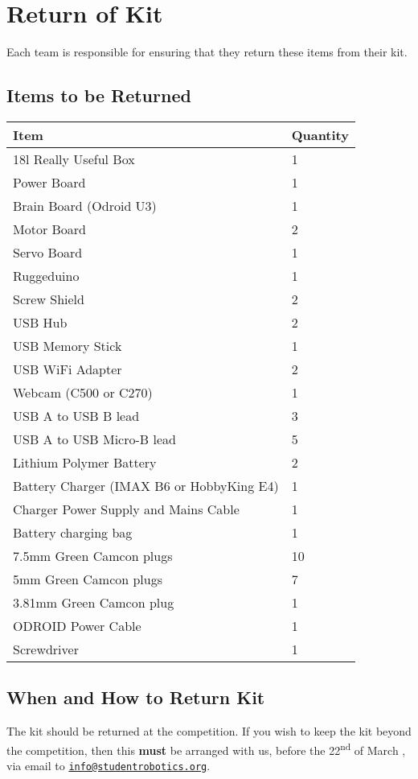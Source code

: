 \section {Return of Kit}
\label{sec:kit-return}

Each team is responsible for ensuring that they return these items from their kit.

\subsection {Items to be Returned}

\begin{tabular}{ll}
 \toprule
 \textbf{Item} & \textbf{Quantity} \\
 \midrule
 18l Really Useful Box & 1 \\

 Power Board & 1 \\
 Brain Board (Odroid U3) & 1 \\
 Motor Board & 2 \\
 Servo Board & 1 \\
 Ruggeduino & 1 \\
 Screw Shield & 2 \\

 USB Hub & 2 \\
 USB Memory Stick & 1 \\
 USB WiFi Adapter & 2 \\
 Webcam (C500 or C270) & 1 \\
 USB A to USB B lead & 3 \\
 USB A to USB Micro-B lead & 5 \\

 Lithium Polymer Battery & 2 \\
 Battery Charger (IMAX B6 or HobbyKing E4) & 1 \\
 Charger Power Supply and Mains Cable & 1 \\
 Battery charging bag & 1 \\

 7.5mm Green Camcon plugs & 10 \\
 5mm Green Camcon plugs & 7 \\
 3.81mm Green Camcon plug & 1 \\
 ODROID Power Cable & 1 \\
 Screwdriver & 1 \\
 \bottomrule
\end{tabular}

\subsection {When and How to Return Kit}

The kit should be returned at the competition.
If you wish to keep the kit beyond the competition, then this \textbf{must} be arranged with us,
 before the 22\textsuperscript{nd} of March \sryear, via email to \href{mailto:info@studentrobotics.org}{\nolinkurl{info@studentrobotics.org}}.

